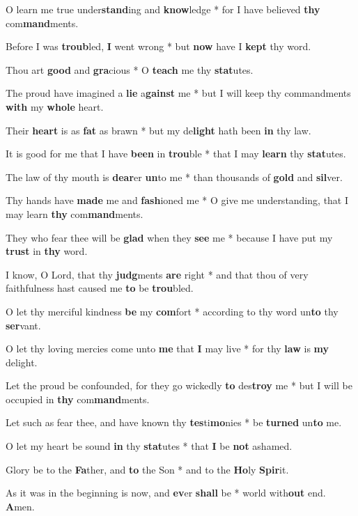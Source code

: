 \begin{multicols}{2}
	O learn me true under\textbf{stand}ing and \textbf{know}ledge * for I have believed \textbf{thy} com\textbf{mand}ments.
	
	Before I was \textbf{troub}led, \textbf{I} went wrong * but \textbf{now} have I \textbf{kept} thy word.
	
	Thou art \textbf{good} and \textbf{gra}cious * O \textbf{teach} me thy \textbf{stat}utes.
	
	The proud have imagined a \textbf{lie} a\textbf{gainst} me * but I will keep thy commandments \textbf{with} my \textbf{whole} heart.
	
	Their \textbf{heart} is as \textbf{fat} as brawn * but my de\textbf{light} hath been \textbf{in} thy law.
	
	It is good for me that I have \textbf{been} in \textbf{trou}ble * that I may \textbf{learn} thy \textbf{stat}utes.
	
	The law of thy mouth is \textbf{dear}er \textbf{un}to me * than thousands of \textbf{gold} and \textbf{sil}ver.
	
	Thy hands have \textbf{made} me and \textbf{fash}ioned me * O give me understanding, that I may learn \textbf{thy} com\textbf{mand}ments.
	
	They who fear thee will be \textbf{glad} when they \textbf{see} me * because I have put my \textbf{trust} in \textbf{thy} word.
	
	I know, O Lord, that thy \textbf{judg}ments \textbf{are} right * and that thou of very faithfulness hast caused me \textbf{to} be \textbf{trou}bled.
	
	O let thy merciful kindness \textbf{be} my \textbf{com}fort * according to thy word un\textbf{to} thy \textbf{ser}vant.
	
	O let thy loving mercies come unto \textbf{me} that \textbf{I} may live * for thy \textbf{law} is \textbf{my} delight.
	
	Let the proud be confounded, for they go wickedly \textbf{to} des\textbf{troy} me * but I will be occupied in \textbf{thy} com\textbf{mand}ments.
	
	Let such as fear thee, and have known thy \textbf{tes}ti\textbf{mo}nies * be \textbf{turned} un\textbf{to} me.
	
	O let my heart be sound \textbf{in} thy \textbf{stat}utes * that \textbf{I} be \textbf{not} ashamed.
	
	Glory be to the \textbf{Fa}ther, and \textbf{to} the Son * and to the \textbf{Ho}ly \textbf{Spir}it.
	
	As it was in the beginning is now, and \textbf{ev}er \textbf{shall} be * world with\textbf{out} end. \textbf{A}men.
\end{multicols}